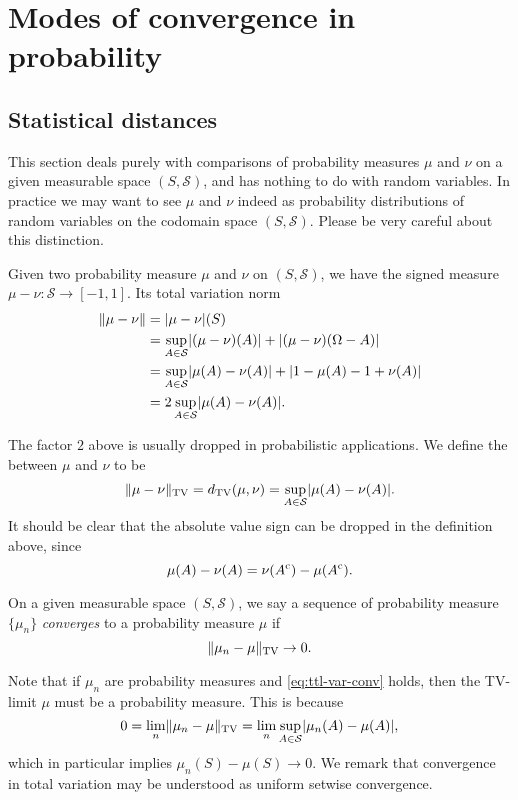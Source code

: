 \chapter{Modes of convergence in probability}
\section{Statistical distances}
\begin{namedthm*}
    This section deals purely with comparisons of probability measures $\mu$ and $\nu$ on a given measurable space $(S,\mathcal S)$, and has nothing to do with random variables. In practice we may want to see $\mu$ and $\nu$ indeed as probability distributions of random variables on the codomain space $(S,\mathcal S)$. Please be very careful about this distinction.
\end{namedthm*}

Given two probability measure $\mu$ and $\nu$ on $(S,\mathcal S)$, we have the signed measure $\mu - \nu \colon \mathcal S \to [-1,1]$. Its total variation norm \begin{align*}
    \lVert \mu - \nu \rVert & = \lvert \mu-\nu \rvert(S) \\
    & = \sup_{A\in \mathcal S}\lvert (\mu-\nu)(A) \rvert + \lvert (\mu-\nu)(\Omega - A) \rvert \\
    & = \sup_{A \in \mathcal S} \lvert \mu(A) - \nu(A) \rvert + \lvert 1 - \mu(A) - 1 + \nu(A) \rvert \\
    & = 2\sup_{A\in \mathcal S}\lvert \mu(A) - \nu(A) \rvert.
\end{align*}

The factor $2$ above is usually dropped in probabilistic applications. We define the  between $\mu$ and $\nu$ to be \[
    \lVert \mu-\nu \rVert_{\mathrm{TV}} = d_\mathrm{TV}(\mu,\nu) = \sup_{A \in \mathcal S} \lvert \mu(A) - \nu(A) \rvert.
\] It should be clear that the absolute value sign can be dropped in the definition above, since \[\mu(A) - \nu(A) = \nu(A^{\mathrm{c}}) - \mu(A^{\mathrm{c}}).\]

\begin{defn}
    On a given measurable space $(S,\mathcal S)$, we say a sequence of probability measure $\{\mu_n\}$ \emph{converges} to a probability measure $\mu$  if \begin{equation}
        \tv{\mu_n -\mu} \to 0. \label{eq:ttl-var-conv}
    \end{equation}
\end{defn}
Note that if $\mu_n$ are probability measures and \eqref{eq:ttl-var-conv} holds, then the TV-limit $\mu$ must be a probability measure. This is because \[
    0 = \lim_n \lVert \mu_n -\mu \rVert_{\mathrm{TV}} = \lim_n \sup_{A\in \mathcal S} \lvert \mu_n(A) - \mu(A) \rvert,
\] which in particular implies $\mu_n (S) - \mu(S) \to 0$. We remark that convergence in total variation may be understood as uniform setwise convergence.

